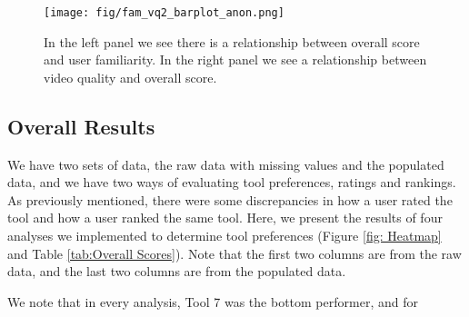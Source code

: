 \begin{wrapfigure}[15]{t!}{0.65\textwidth}
    \vspace{-18mm}
    \centering
    \texttt{[image: fig/fam\_vq2\_barplot\_anon.png]}
    \captionsetup{font = scriptsize}
    \caption{In the left panel we see there is a relationship between overall score and user familiarity. In the right panel we see a relationship between video quality and overall score.}
    \label{fig:sig}
\end{wrapfigure}

\vspace{-2mm}
\subsection{Overall Results}
\vspace{-2mm}
We have two sets of data, the raw data with missing values and the populated data, and we have two ways of evaluating tool preferences, ratings and rankings. As previously mentioned, there were some discrepancies in how a user rated the tool and how a user ranked the same tool. Here, we present the results of four analyses we implemented to determine tool preferences (Figure \ref{fig: Heatmap} and Table \ref{tab:Overall Scores}). Note that the first two columns are from the raw data, and the last two columns are from the populated data. 

We note that in every analysis, Tool 7 was the bottom performer, and for

